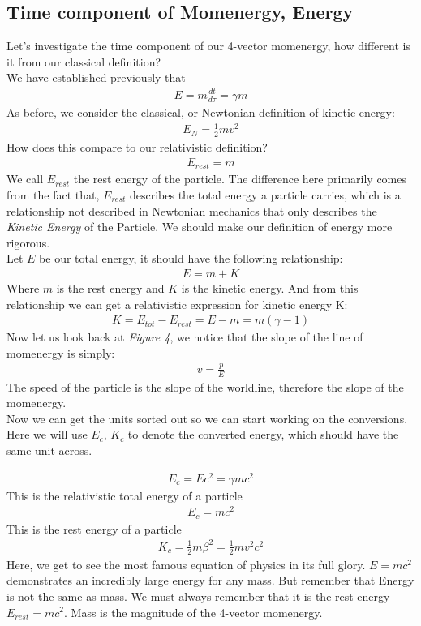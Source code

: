 \documentclass[12pt]{book}
\newcommand{\dydx}[2]{\frac{d #1}{d #2}}
\begin{document}
\subsection{Time component of Momenergy, Energy}
Let's investigate the time component of our 4-vector momenergy, how different is it from our classical definition?\\
\newline 
We have established previously that 
\begin{align}
E =m \dydx{t}{\tau} =\gamma m
\end{align}
As before, we consider the classical, or Newtonian definition of kinetic energy:
\begin{align}
E_{N} = \frac{1}{2}mv^2
\end{align}
How does this compare to our relativistic definition?
\begin{align}
E_{rest} = m
\end{align}
We call $E_{rest}$ the rest energy of the particle. The difference here primarily comes from the fact that, $E_{rest}$ describes the total energy a particle carries, which is a relationship not described in Newtonian mechanics that only describes the \textit{Kinetic Energy} of the Particle. We should make our definition of energy more rigorous. \\
\newline
Let $E$ be our total energy, it should have the following relationship:
\begin{align}
E = m + K
\end{align}
Where $m$ is the rest energy and $K$ is the kinetic energy. And from this relationship we can get a relativistic expression for kinetic energy K:
\begin{align}
K = E_{tot} - E_{rest} = E - m = m(\gamma - 1)
\end{align}
Now let us look back at \textit{Figure 4}, we notice that the slope of the line of momenergy is simply:
\begin{align}
v = \frac{p}{E}
\end{align}
The speed of the particle is the slope of the worldline, therefore the slope of the momenergy. \\
\newline
Now we can get the units sorted out so we can start working on the conversions. Here we will use $E_c$, $K_c$ to denote the converted energy, which should have the same unit across.

\begin{align}
E_c = Ec^2 = \gamma mc^2
\end{align}
This is the relativistic total energy of a particle 
\begin{align}
E_c = mc^2
\end{align}
This is the rest energy of a particle
\begin{align}
K_c = \frac{1}{2}m\beta^2= \frac{1}{2}mv^2c^2 
\end{align}
Here, we get to see the most famous equation of physics in its full glory. $E = mc^2$ demonstrates an incredibly large energy for any mass. But remember that Energy is not the same as mass. We must always remember that it is the rest energy $E_{rest} = mc^2$. Mass is the magnitude of the 4-vector momenergy. 
\end{document}
